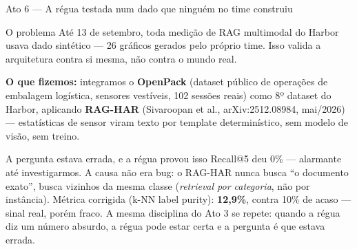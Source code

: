 \documentclass{beamer}
\newenvironment{numerobloco}[1]{\begin{block}{#1}}{\end{block}}
\newenvironment{decisaobloco}[1]{\begin{alertblock}{#1}}{\end{alertblock}}
\begin{document}
\begin{frame}{Ato 6 --- A régua testada num dado que ninguém no time construiu}
  \small
  \begin{numerobloco}{O problema}
    Até 13 de setembro, toda medição de RAG multimodal do Harbor usava dado sintético
    --- 26 gráficos gerados pelo próprio time. Isso valida a arquitetura contra si
    mesma, não contra o mundo real.
  \end{numerobloco}

  \pause
  \textbf{O que fizemos:} integramos o \textbf{OpenPack} (dataset público de operações
  de embalagem logística, sensores vestíveis, 102 sessões reais) como 8º dataset do
  Harbor, aplicando \textbf{RAG-HAR} (Sivaroopan et al., arXiv:2512.08984, mai/2026)
  --- estatísticas de sensor viram texto por template determinístico, sem modelo de
  visão, sem treino.

  \pause
  \begin{decisaobloco}{A pergunta estava errada, e a régua provou isso}
    Recall@5 deu 0\% --- alarmante até investigarmos. A causa não era bug: o
    RAG-HAR nunca busca ``o documento exato'', busca vizinhos da mesma classe
    (\emph{retrieval por categoria}, não por instância). Métrica corrigida
    (k-NN label purity): \textbf{12,9\%}, contra 10\% de acaso --- sinal real,
    porém fraco. A mesma disciplina do Ato 3 se repete: quando a régua diz um
    número absurdo, a régua pode estar certa e a pergunta é que estava errada.
  \end{decisaobloco}
\end{frame}
\end{document}
